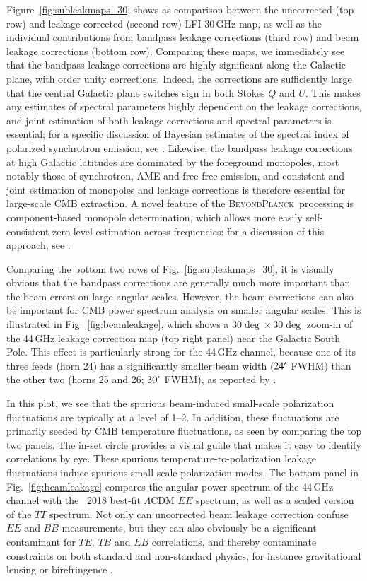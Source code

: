 \documentclass[twocolumn]{aa}
\newcommand{\BP}{\textsc{BeyondPlanck}}
\newcommand{\?}[1]{\textcolor{red}{{\bf [#1]}}}
\begin{document}
Figure~\ref{fig:subleakmaps_30} shows as comparison between the
uncorrected (top row) and leakage corrected (second row) LFI 30\,GHz
map, as well as the individual contributions from bandpass leakage
corrections (third row) and beam leakage corrections (bottom
row). Comparing these maps, we immediately see that the bandpass
leakage corrections are highly significant along the Galactic plane,
with order unity corrections. Indeed, the corrections are sufficiently
large that the central Galactic plane switches sign in both Stokes $Q$
and $U$. This makes any estimates of spectral parameters
highly dependent on the leakage corrections, and joint estimation of both
leakage corrections and spectral parameters is essential; for a
specific discussion of Bayesian estimates of the spectral index of
polarized synchrotron emission, see \citet{bp14}. Likewise, the
bandpass leakage corrections at high Galactic latitudes are dominated
by the foreground monopoles, most notably those of synchrotron, AME
and free-free emission, and consistent and joint estimation of
monopoles and leakage corrections is therefore essential for
large-scale CMB extraction. A novel feature of the \BP\ processing is
component-based monopole determination, which allows more easily
self-consistent zero-level estimation across frequencies; for a
discussion of this approach, see \citet{bp13}.


Comparing the bottom two rows of Fig.~\ref{fig:subleakmaps_30}, it is
visually obvious that the bandpass corrections are generally much more
important than the beam errors on large angular scales. However, the
beam corrections can also be important for CMB power spectrum
analysis on smaller angular scales. This is illustrated in
Fig.~\ref{fig:beamleakage}, which shows a $30\deg\times30\deg$ zoom-in
of the 44\,GHz leakage correction map (top right panel) near the
Galactic South Pole. This effect is particularly strong for the
44\,GHz channel, because one of its three feeds (horn 24) has a
significantly smaller beam width ($24\arcm$ FWHM) than the other two
(horns 25 and 26; $30\arcm$ FWHM), as reported by
\citet{planck2014-a05}.

In this plot, we see that the spurious beam-induced small-scale polarization fluctuations are typically
at a level of 1--2\muK. In addition, these fluctuations are primarily
seeded by CMB temperature fluctuations, as seen by comparing the top
two panels. The in-set circle provides a visual guide that makes it
easy to identify correlations by eye. These spurious
temperature-to-polarization leakage fluctuations induce spurious
small-scale polarization modes. The bottom panel in
Fig.~\ref{fig:beamleakage} compares the angular power spectrum of the
44\,GHz channel with the \Planck\ 2018 best-fit $\Lambda$CDM $EE$
spectrum, as well as a scaled version of the $TT$ spectrum. Not only
can uncorrected beam leakage correction confuse $EE$ and $BB$
measurements, but they can also obviously be a significant contaminant
for $TE$, $TB$ and $EB$ correlations, and thereby contaminate
constraints on both standard and non-standard physics, for instance
gravitational lensing \citep[e.g.,][]{planck2015-XLI} or birefringence \citep[e.g.,][]{minami:2020}.
\end{document}
